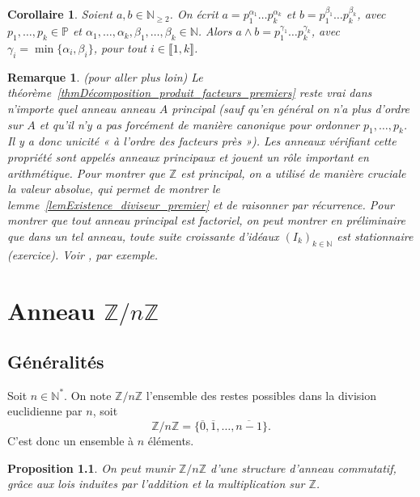 \documentclass[10pt,a4paper]{report}
\newtheorem*{rem}{Remarque}
\newtheorem{Prop}[thm]{Proposition}
\newtheorem{Cor}[thm]{Corollaire}
\newcommand{\N}{\mathbb{N}}
\newcommand{\Z}{\mathbb{Z}}
\begin{document}
\begin{Cor}
Soient $a,b\in \N_{\geq 2}$. On écrit $a=p_1^{\alpha_1}\ldots p_k^{\alpha_k}$ et $b=p_1^{\beta_1}\ldots p_{k}^{\beta_k}$, avec $p_1,\ldots,p_k\in \mathbb{P}$ et $\alpha_1,\ldots,\alpha_k,\beta_1,\ldots,\beta_k\in \N$. Alors $a\wedge b=p_1^{\gamma_1}\ldots p_k^{\gamma_k}$, avec $\gamma_i=\min \{\alpha_i,\beta_i\}$, pour tout $i\in \llbracket 1,k\rrbracket$.
\end{Cor}

\begin{rem}(pour aller plus loin)
Le théorème~\ref{thmDécomposition_produit_facteurs_premiers} reste vrai dans n'importe quel anneau anneau $A$ principal (sauf qu'en général on n'a plus d'ordre sur $A$ et qu'il n'y a pas forcément de manière canonique pour ordonner $p_1,\ldots, p_k$. Il y a donc unicité « à l'ordre des facteurs près »). Les anneaux vérifiant cette propriété sont appelés anneaux principaux et jouent un rôle important en arithmétique. Pour montrer que $\Z$ est principal, on a utilisé de manière cruciale la valeur absolue, qui permet de montrer le lemme~\ref{lemExistence_diviseur_premier} et de raisonner par récurrence. Pour montrer que tout anneau principal est factoriel, on peut montrer en préliminaire que dans un tel anneau, toute suite croissante d'idéaux $(I_k)_{k\in \N}$ est stationnaire (exercice). Voir \cite[Chapitre 11]{combes1998algebre}, par exemple.

\end{rem}


\chapter{Anneau $\mathbb{Z}/n \mathbb{Z}$}


\section{Généralités}

Soit $n \in \mathbb{N}^*$. On note $\mathbb{Z}/n \mathbb{Z}$ l'ensemble des restes possibles dans la division euclidienne par $n$, soit
$$  \mathbb{Z}/n\mathbb{Z}= \{  \overline{0}, \overline{1}, \ldots, \overline{n-1} \}.   $$ 
C'est donc un ensemble à $n$ éléments.

\begin{Prop}
On peut munir $\mathbb{Z}/n\mathbb{Z}$ d'une structure d'anneau commutatif, grâce aux lois induites par l'addition et la multiplication sur $\mathbb{Z}$.
\end{Prop}
\end{document}

